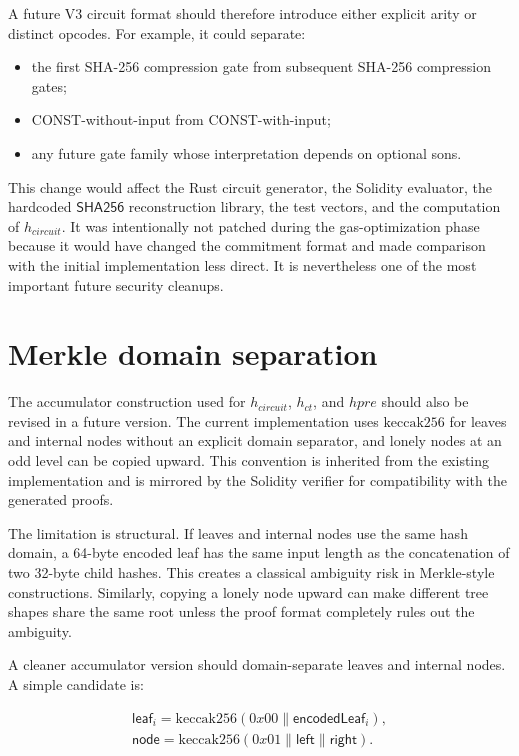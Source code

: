 A future V3 circuit format should therefore introduce either explicit arity or distinct
opcodes. For example, it could separate:

\begin{itemize}
  \item the first SHA-256 compression gate from subsequent SHA-256 compression gates;
  \item CONST-without-input from CONST-with-input;
  \item any future gate family whose interpretation depends on optional sons.
\end{itemize}

This change would affect the Rust circuit generator, the Solidity evaluator, the
hardcoded \(\mathsf{SHA256}\) reconstruction library, the test vectors, and the computation
of \(h_{\mathit{circuit}}\). It was intentionally not patched during the gas-optimization
phase because it would have changed the commitment format and made comparison with the
initial implementation less direct. It is nevertheless one of the most important future
security cleanups.

\section{Merkle domain separation}

The accumulator construction used for \(h_{\mathit{circuit}}\), \(h_{\mathit{ct}}\), and
\(hpre\) should also be revised in a future version. The current implementation uses
\(\mathrm{keccak256}\) for leaves and internal nodes without an explicit domain separator,
and lonely nodes at an odd level can be copied upward. This convention is inherited from
the existing implementation and is mirrored by the Solidity verifier for compatibility with
the generated proofs.

The limitation is structural. If leaves and internal nodes use the same hash domain, a
64-byte encoded leaf has the same input length as the concatenation of two 32-byte child
hashes. This creates a classical ambiguity risk in Merkle-style constructions. Similarly,
copying a lonely node upward can make different tree shapes share the same root unless the
proof format completely rules out the ambiguity.

A cleaner accumulator version should domain-separate leaves and internal nodes. A simple
candidate is:

\[
\begin{aligned}
  \mathsf{leaf}_i =
  \mathrm{keccak256}(0x00 \parallel \mathsf{encodedLeaf}_i), \\
  \mathsf{node} =
  \mathrm{keccak256}(0x01 \parallel \mathsf{left} \parallel \mathsf{right}).
\end{aligned}
\]

